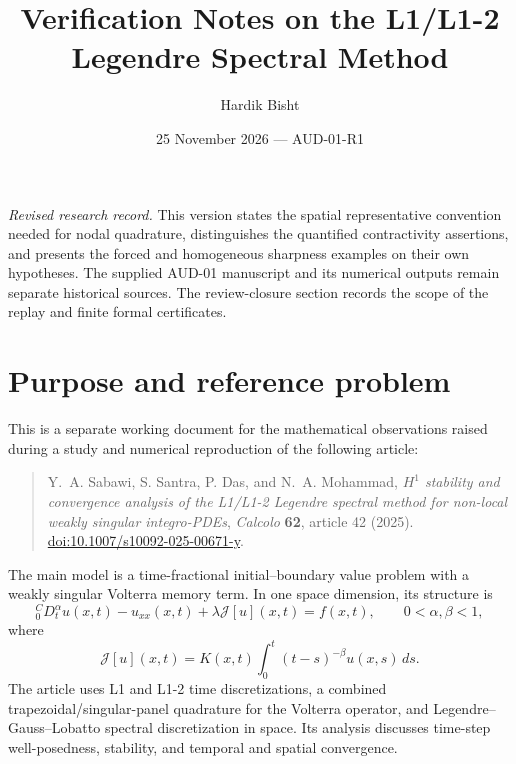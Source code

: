 \documentclass[11pt,a4paper]{amsart}
\title[Verification notes on a Legendre spectral method]{Verification Notes on the L1/L1-2\\Legendre Spectral Method}
\author{Hardik Bisht}
\date{25 November 2026 --- AUD-01-R1}
\theoremstyle{remark}
\theoremstyle{plain}
\theoremstyle{remark}
\numberwithin{equation}{section}
\begin{document}
\maketitle

\noindent\textit{Revised research record.} This version states the spatial representative convention needed for nodal quadrature, distinguishes the quantified contractivity assertions, and presents the forced and homogeneous sharpness examples on their own hypotheses. The supplied AUD-01 manuscript and its numerical outputs remain separate historical sources. The review-closure section records the scope of the replay and finite formal certificates.

\section{Purpose and reference problem}

This is a separate working document for the mathematical observations raised during a study and numerical reproduction of the following article:
\begin{quote}
Y.~A. Sabawi, S. Santra, P. Das, and N.~A. Mohammad, 
\emph{$H^1$ stability and convergence analysis of the L1/L1-2 Legendre spectral method for non-local weakly singular integro-PDEs}, 
\emph{Calcolo} \textbf{62}, article 42 (2025). 
\href{https://doi.org/10.1007/s10092-025-00671-y}{doi:10.1007/s10092-025-00671-y}.
\end{quote}

The main model is a time-fractional initial--boundary value problem with a weakly singular Volterra memory term. In one space dimension, its structure is
\begin{equation}
 {}_0^CD_t^\alpha u(x,t)-u_{xx}(x,t)+\lambda\mathcal J[u](x,t)=f(x,t),
 \qquad 0<\alpha,\beta<1,
\end{equation}
where
\begin{equation}
 \mathcal J[u](x,t)=K(x,t)\int_0^t(t-s)^{-\beta}u(x,s)\,ds.
\end{equation}
The article uses L1 and L1-2 time discretizations, a combined trapezoidal/singular-panel quadrature for the Volterra operator, and Legendre--Gauss--Lobatto spectral discretization in space. Its analysis discusses time-step well-posedness, stability, and temporal and spatial convergence.
\end{document}
